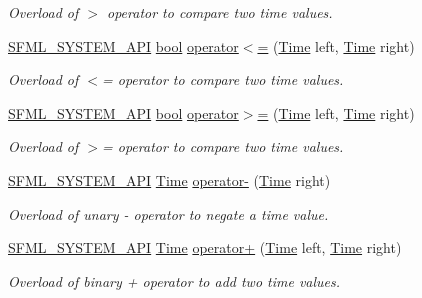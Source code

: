 \begin{DoxyCompactItemize}
\begin{DoxyCompactList}\small\item\em Overload of $>$ operator to compare two time values. \end{DoxyCompactList}\item 
\hyperlink{sfml_2dep_2_s_f_m_l-2_84_82_2include_2_s_f_m_l_2_system_2_export_8hpp_a6476c9e422606477a4c23d92b1d79a1f}{S\-F\-M\-L\-\_\-\-S\-Y\-S\-T\-E\-M\-\_\-\-A\-P\-I} \hyperlink{term__entry_8h_a002004ba5d663f149f6c38064926abac}{bool} \hyperlink{classsf_1_1_time_a2c22369869bf903578635bc6517c44d4}{operator$<$=} (\hyperlink{classsf_1_1_time}{Time} left, \hyperlink{classsf_1_1_time}{Time} right)
\begin{DoxyCompactList}\small\item\em Overload of $<$= operator to compare two time values. \end{DoxyCompactList}\item 
\hyperlink{sfml_2dep_2_s_f_m_l-2_84_82_2include_2_s_f_m_l_2_system_2_export_8hpp_a6476c9e422606477a4c23d92b1d79a1f}{S\-F\-M\-L\-\_\-\-S\-Y\-S\-T\-E\-M\-\_\-\-A\-P\-I} \hyperlink{term__entry_8h_a002004ba5d663f149f6c38064926abac}{bool} \hyperlink{classsf_1_1_time_ad69edc80cd01b7a03f5673b4276181eb}{operator$>$=} (\hyperlink{classsf_1_1_time}{Time} left, \hyperlink{classsf_1_1_time}{Time} right)
\begin{DoxyCompactList}\small\item\em Overload of $>$= operator to compare two time values. \end{DoxyCompactList}\item 
\hyperlink{sfml_2dep_2_s_f_m_l-2_84_82_2include_2_s_f_m_l_2_system_2_export_8hpp_a6476c9e422606477a4c23d92b1d79a1f}{S\-F\-M\-L\-\_\-\-S\-Y\-S\-T\-E\-M\-\_\-\-A\-P\-I} \hyperlink{classsf_1_1_time}{Time} \hyperlink{classsf_1_1_time_a1b23b91cf367764338c2ff922c65da4e}{operator-\/} (\hyperlink{classsf_1_1_time}{Time} right)
\begin{DoxyCompactList}\small\item\em Overload of unary -\/ operator to negate a time value. \end{DoxyCompactList}\item 
\hyperlink{sfml_2dep_2_s_f_m_l-2_84_82_2include_2_s_f_m_l_2_system_2_export_8hpp_a6476c9e422606477a4c23d92b1d79a1f}{S\-F\-M\-L\-\_\-\-S\-Y\-S\-T\-E\-M\-\_\-\-A\-P\-I} \hyperlink{classsf_1_1_time}{Time} \hyperlink{classsf_1_1_time_a7155e965f238f8c32d63649b0189ef47}{operator+} (\hyperlink{classsf_1_1_time}{Time} left, \hyperlink{classsf_1_1_time}{Time} right)
\begin{DoxyCompactList}\small\item\em Overload of binary + operator to add two time values. \end{DoxyCompactList}\item 

\end{DoxyCompactItemize}
